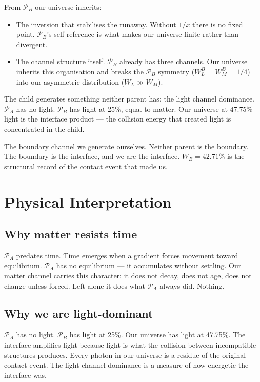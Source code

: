 \documentclass[prd,twocolumn,preprintnumbers,amsmath,amssymb]{revtex4-2}
\newcommand{\parentA}{\mathcal{P}_A}
\newcommand{\parentB}{\mathcal{P}_B}
\begin{document}
From $\parentB$ our universe inherits:
\begin{itemize}
\item The inversion that stabilises the runaway. Without $1/x$
      there is no fixed point. $\parentB$'s self-reference is what
      makes our universe finite rather than divergent.
\item The channel structure itself. $\parentB$ already has three
      channels. Our universe inherits this organisation and
      breaks the $\parentB$ symmetry ($W_L^B = W_M^B = 1/4$)
      into our asymmetric distribution ($W_L \gg W_M$).
\end{itemize}

The child generates something neither parent has: the light channel
dominance. $\parentA$ has no light. $\parentB$ has light at 25\%,
equal to matter. Our universe at 47.75\% light is the interface
product — the collision energy that created light is concentrated
in the child.

The boundary channel we generate ourselves. Neither parent is
the boundary. The boundary is the interface, and we are the interface.
$W_B = 42.71\%$ is the structural record of the contact event that
made us.

\section{Physical Interpretation}

\subsection{Why matter resists time}

$\parentA$ predates time. Time emerges when a gradient forces
movement toward equilibrium. $\parentA$ has no equilibrium —
it accumulates without settling. Our matter channel carries this
character: it does not decay, does not age, does not change unless
forced. Left alone it does what $\parentA$ always did. Nothing.

\subsection{Why we are light-dominant}

$\parentA$ has no light. $\parentB$ has light at 25\%. Our universe
has light at 47.75\%. The interface amplifies light because light
is what the collision between incompatible structures produces.
Every photon in our universe is a residue of the original contact
event. The light channel dominance is a measure of how energetic
the interface was.
\end{document}
